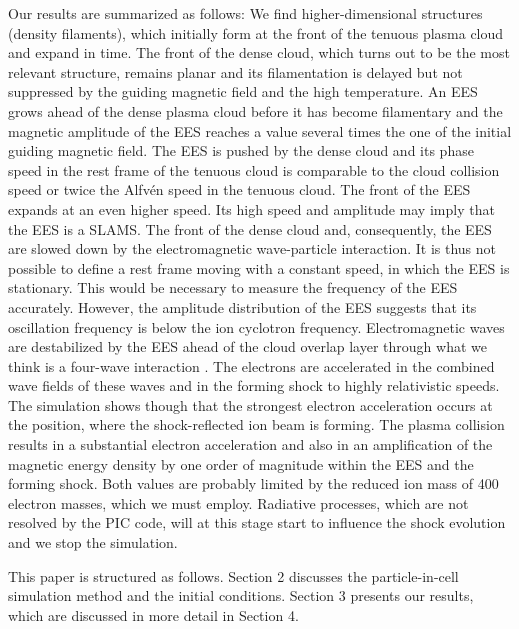 \documentclass[structabstract]{aa}
\begin{document}
Our results are summarized as follows: We find higher-dimensional structures 
(density filaments), which initially form at the front of the tenuous plasma 
cloud and expand in time. The front of the dense cloud, which turns out to 
be the most relevant structure, remains planar and its filamentation is
delayed but not suppressed by the guiding magnetic field and the high 
temperature. An EES grows ahead of the dense plasma cloud before it has 
become filamentary and the magnetic amplitude of the EES reaches a value 
several times the one of the initial guiding magnetic field. The EES is 
pushed by the dense cloud and its phase speed in the rest frame of the 
tenuous cloud is comparable to the cloud collision speed or twice the 
Alfv\'en speed in the tenuous cloud. The front of the EES expands at an 
even higher speed. Its high speed and amplitude may imply that the EES is 
a SLAMS. The front of the dense cloud and, consequently, the EES are slowed 
down by the electromagnetic wave-particle interaction. It is thus not 
possible to define a rest frame moving with a constant speed, in which the 
EES is stationary. This would be necessary to measure the frequency of the 
EES accurately. However, the amplitude distribution of the EES suggests that 
its oscillation frequency is below the ion cyclotron frequency. 
Electromagnetic waves are destabilized by the EES ahead of the cloud overlap 
layer through what we think is a four-wave interaction \citep{Instability}.
The electrons are accelerated in the combined wave fields of these waves and
in the forming shock to highly relativistic speeds. The simulation shows
though that the strongest electron acceleration occurs at the position,
where the shock-reflected ion beam is forming. The plasma collision results 
in a substantial electron acceleration and also in an amplification of the 
magnetic energy density by one order of magnitude within the EES and the 
forming shock. Both values are probably limited by the reduced ion mass of 
400 electron masses, which we must employ. Radiative processes, which are 
not resolved by the PIC code, will at this stage start to influence the 
shock evolution \citep{Schl1,Schl2} and we stop the simulation.

This paper is structured as follows. Section 2 discusses the particle-in-cell
simulation method and the initial conditions. Section 3 presents our 
results, which are discussed in more detail in Section 4. 

\end{document}
